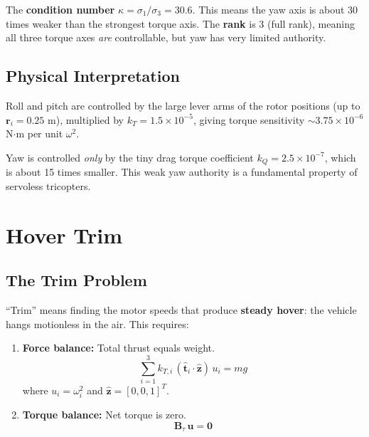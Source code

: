 \documentclass[12pt, a4paper]{article}
\newcommand{\bu}{\bm{u}}
\newcommand{\bB}{\bm{B}}
\begin{document}
The \textbf{condition number} $\kappa = \sigma_1 / \sigma_3 = 30.6$.  This means the yaw axis is about 30 times weaker than the strongest torque axis.  The \textbf{rank} is 3 (full rank), meaning all three torque axes \emph{are} controllable, but yaw has very limited authority.

\subsection{Physical Interpretation}

Roll and pitch are controlled by the large lever arms of the rotor positions (up to $\bm{r}_i = 0.25$ m), multiplied by $k_T = 1.5 \times 10^{-5}$, giving torque sensitivity $\sim 3.75 \times 10^{-6}$ N$\cdot$m per unit $\omega^2$.

Yaw is controlled \emph{only} by the tiny drag torque coefficient $k_Q = 2.5 \times 10^{-7}$, which is about 15 times smaller.  This weak yaw authority is a fundamental property of servoless tricopters.

\section{Hover Trim}
\label{sec:trim}

\subsection{The Trim Problem}

``Trim'' means finding the motor speeds that produce \textbf{steady hover}: the vehicle hangs motionless in the air.  This requires:
\begin{enumerate}
    \item \textbf{Force balance:} Total thrust equals weight.
    \begin{equation}
        \sum_{i=1}^{3} k_{T,i} \, (\hat{\bm{t}}_i \cdot \hat{\bm{z}}) \, u_i = m g
        \label{eq:thrust_balance}
    \end{equation}
    where $u_i = \omega_i^2$ and $\hat{\bm{z}} = [0,0,1]^T$.

    \item \textbf{Torque balance:} Net torque is zero.
    \begin{equation}
        \bB_\tau \, \bu = \bm{0}
        \label{eq:torque_balance}
    \end{equation}
\end{enumerate}
\end{document}

